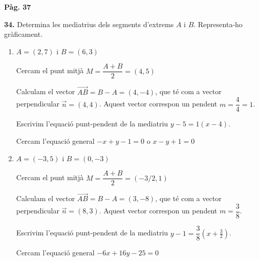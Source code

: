\documentclass{book}
\begin{document}
	
{\Large \bf Pàg. 37}	
	
\begin{mylist}

	\item[{\Large \bf 34.}] Determina les mediatrius dels segments d'extrems $A$ i $B$. Representa-ho gràficament.
	
	\begin{enumerate}
		\item $A=(2,7)$ i $B=(6,3)$
			\begin{bluebox}
					Cercam el punt mitjà $M=\dfrac{A+B}{2}=(4, 5)$
					
					Calculam el vector $\overrightarrow{AB}=B-A=(4, -4)$, que té com a vector perpendicular $\vec n = (4,4)$. Aquest vector correspon un pendent $m = \dfrac{4}{4}=1$.
					
					Escrivim l'equació punt-pendent de la mediatriu $y-5 = 1 (x-4)$.
					
					Cercam l'equació general $-x+y-1=0$ o $x-y+1=0$
					
					\begin{center}
					\end{center}
			\end{bluebox}
		
		\item $A=(-3,5)$ i $B=(0, -3)$
		\begin{bluebox}
			 Cercam el punt mitjà $M=\dfrac{A+B}{2}=(-3/2, 1)$
			
			Calculam el vector $\overrightarrow{AB}=B-A=(3, -8)$, que té com a vector perpendicular $\vec n = (8,3)$. Aquest vector correspon un pendent $m = \dfrac{3}{8}$.
			
			Escrivim l'equació punt-pendent de la mediatriu $y-1 = \dfrac{3}{8} (x+\frac{3}{2})$.
			
			Cercam l'equació general $-6x+16y-25=0$
			

\end{bluebox}
\end{enumerate}
\end{mylist}
\end{document}
